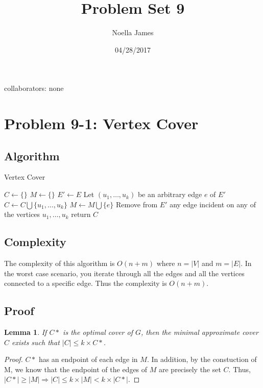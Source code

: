 \documentclass{article}
\theoremstyle{definition}
\theoremstyle{remark}
\theoremstyle{plain}
\newtheorem{lem}[thm]{Lemma}
\begin{document}
\title{Problem Set 9}
\date{04/28/2017}
\author{Noella James}
\maketitle
collaborators: none\\

\section*{Problem 9-1: Vertex Cover}

\subsection*{Algorithm}

\begin{algorithm}
\caption{Vertex Cover}\label{K approximation vertex cover algorithm for k hypergraph}
\begin{algorithmic}[1]
	\State $C \gets \{\}$
	\State $M \gets \{\}$
	\State $E' \gets E$
		\State Let $(u_1, \ldots, u_k)$  be an arbitrary edge $e$ of $E'$
		\State $C \gets C \bigcup \{u_1, \ldots, u_k\}$ 
		\State $M \gets M \bigcup \{e\}$
		\State Remove from $E'$ any edge incident on any of the vertices $u_1, \ldots, u_k$
	\EndWhile
	\State return $C$
\EndProcedure
\end{algorithmic}
\end{algorithm}

\subsection*{Complexity}

The complexity of this algorithm is $O(n + m)$ where $n = |V|$ and $m = |E|$. In the worst case scenario, you iterate through all the edges and all the vertices connected to a specific edge. Thus the complexity is $O(n + m)$.

\subsection*{Proof}


\begin{lem}
If $C*$ is the optimal cover of $G$, then the minimal approximate cover $C$ exists such that $|C| \leq k \times C*$.
\end{lem}
\begin{proof}
$C*$ has an endpoint of each edge in $M$. In addition, by the constuction of M, we know that the endpoint of the edges of $M$ are precisely the set $C$. Thus, $|C*| \geq |M| \Rightarrow |C| \leq k \times |M| < k \times |C*|$.
\end{proof}
\end{document}
